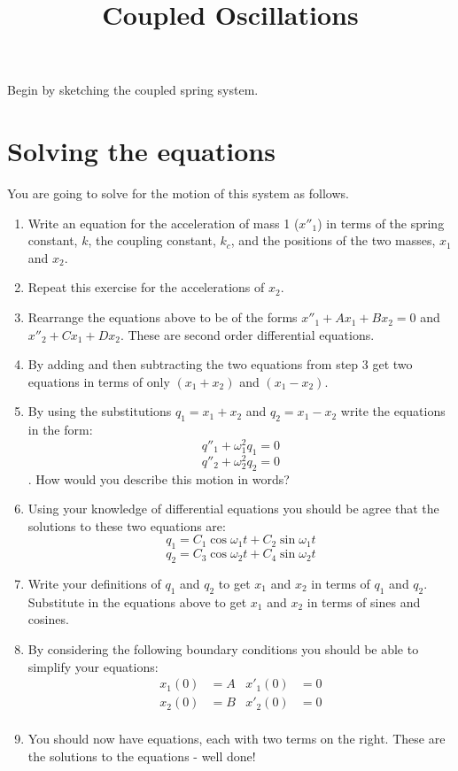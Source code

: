 \documentclass[a4paper]{article}
\title{Coupled Oscillations}
\date{}
\author{}
\begin{document}
\maketitle
Begin by sketching the coupled spring system.
\section*{Solving the equations}
You are going to solve for the motion of this system as follows.
\begin{enumerate}
    \item Write an equation for the acceleration of mass 1 ($x''_1$) in terms of the spring constant, $k$, the coupling constant, $k_c$, and the positions of the two masses, $x_1$ and $x_2$.
    \item Repeat this exercise for the accelerations of $x_2$.
    \item Rearrange the equations above to be of the forms $x''_1 + Ax_1 + Bx_2 = 0$ and $x''_2 + Cx_1 + Dx_2$.  These are second order differential equations.
    \item By adding and then subtracting the two equations from step 3 get two equations in terms of only $\left(x_1 + x_2\right)$ and $\left(x_1 - x_2\right)$.
    \item By using the substitutions $q_1 = x_1 + x_2$ and $q_2 = x_1 - x_2$ write the equations in the form: \[q''_1 + \omega_1^2q_1 = 0 \] \[ q''_2 + \omega_2^2q_2 = 0 \]. How would you describe this motion in words?
    \item Using your knowledge of differential equations you should be agree that the solutions to these two equations are:
        \[ q_1 = C_1\cos{\omega_1 t} + C_2\sin{\omega_1 t} \]
        \[ q_2 = C_3\cos{\omega_2 t} + C_4\sin{\omega_2 t} \]
    \item Write your definitions of $q_1$ and $q_2$ to get $x_1$ and $x_2$ in terms of $q_1$ and $q_2$.  Substitute in the equations above to get $x_1$ and $x_2$ in terms of sines and cosines.
    \item By considering the following boundary conditions you should be able to simplify your equations:
        \begin{align*}
            x_1(0) & = A & x'_1(0) & = 0 \\
            x_2(0) &= B & x'_2(0) &= 0\\
        \end{align*}
    \item You should now have equations, each with two terms on the right.  These are the solutions to the equations - well done!
\end{enumerate}
\end{document}

